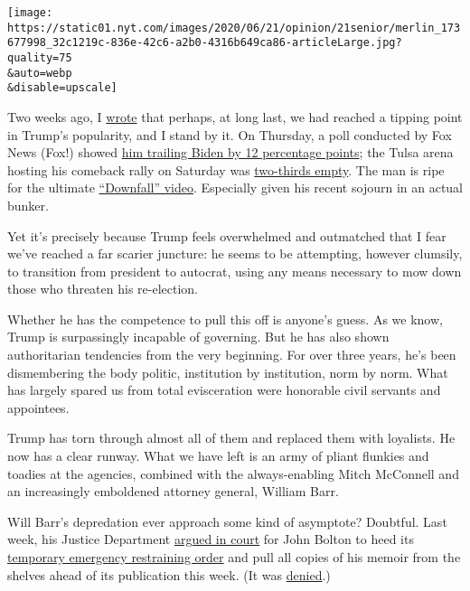 \texttt{[image: https://static01.nyt.com/images/2020/06/21/opinion/21senior/merlin\_173677998\_32c1219c-836e-42c6-a2b0-4316b649ca86-articleLarge.jpg?quality=75\\\&auto=webp\\\&disable=upscale]}

Two weeks ago, I
\href{https://www.nytimes.com/2020/06/07/opinion/trump-mattis-polls.html}{wrote}
that perhaps, at long last, we had reached a tipping point in Trump's
popularity, and I stand by it. On Thursday, a poll conducted by Fox News
(Fox!) showed
\href{https://www.politico.com/news/2020/06/18/fox-news-poll-trump-biden-329153}{him
trailing Biden by 12 percentage points}; the Tulsa arena hosting his
comeback rally on Saturday was
\href{https://www.vox.com/2020/6/21/21298177/trump-tulsa-rally-low-turnout}{two-thirds
empty}. The man is ripe for the ultimate
\href{https://knowyourmeme.com/memes/hitlers-downfall-parodies}{``Downfall''
video}. Especially given his recent sojourn in an actual bunker.

Yet it's precisely because Trump feels overwhelmed and outmatched that I
fear we've reached a far scarier juncture: he seems to be attempting,
however clumsily, to transition from president to autocrat, using any
means necessary to mow down those who threaten his re-election.

Whether he has the competence to pull this off is anyone's guess. As we
know, Trump is surpassingly incapable of governing. But he has also
shown authoritarian tendencies from the very beginning. For over three
years, he's been dismembering the body politic, institution by
institution, norm by norm. What has largely spared us from total
evisceration were honorable civil servants and appointees.

Trump has torn through almost all of them and replaced them with
loyalists. He now has a clear runway. What we have left is an army of
pliant flunkies and toadies at the agencies, combined with the
always-enabling Mitch McConnell and an increasingly emboldened attorney
general, William Barr.

Will Barr's depredation ever approach some kind of asymptote? Doubtful.
Last week, his Justice Department
\href{https://www.nytimes.com/2020/06/19/us/politics/john-bolton-book-hearing.html}{argued
in court} for John Bolton to heed its
\href{https://www.documentcloud.org/documents/6951053-Bolton-TRO.html}{temporary
emergency restraining order} and pull all copies of his memoir from the
shelves ahead of its publication this week. (It was
\href{https://www.nytimes.com/2020/06/20/us/politics/john-bolton-book-ruling.html}{denied}.)

